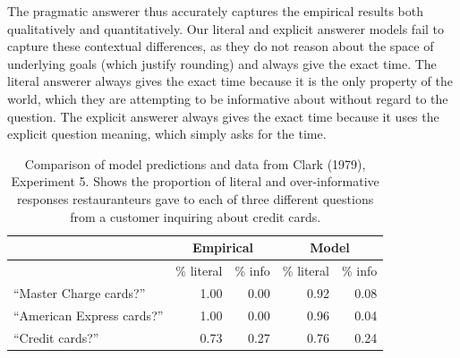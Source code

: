 \documentclass[12pt, floatsintext, jou]{apa6}
\begin{document}
The pragmatic answerer thus accurately captures the empirical results both qualitatively and quantitatively. Our literal and explicit answerer models fail to capture these contextual differences, as they do not reason about the space of underlying goals (which justify rounding) and always give the exact time. The literal answerer always gives the exact time because it is the only property of the world, which they are attempting to be informative about without regard to the question. The explicit answerer always gives the exact time because it uses the explicit question meaning, which simply asks for the time.



\begin{table}[t!]
\centering
\begin{tabular}{ p{5cm} | r | r ||||||  r | r }
& \multicolumn{2}{c||||||}{Empirical} & \multicolumn{2}{c}{Model} \\
\hline
&           \% literal &   \%  info &           \% literal &   \%  info    \\
\hline
``Master Charge cards?'' &   1.00 & 0.00 &  0.92 & 0.08 \\
\hline
``American Express cards?''     & 1.00 & 0.00 & 0.96 & 0.04 \\
\hline
``Credit cards?''     & 0.73 & 0.27 & 0.76 & 0.24 \\
\end{tabular}
\\[1.5pt]
\caption{Comparison of model predictions and data from Clark (1979), Experiment 5. Shows the proportion of literal and over-informative responses restauranteurs gave to each of three different questions from a customer inquiring about credit cards.} 
\label{table:clark79exp5}
\end{table}
\end{document}
